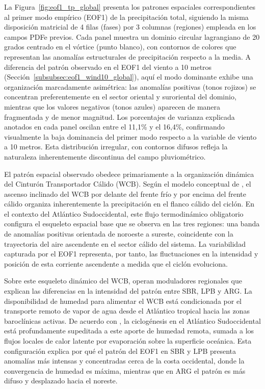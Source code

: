 La Figura~\ref{fig:eof1_tp_global} presenta los patrones espaciales correspondientes al primer modo empírico (EOF1) de la precipitación total, siguiendo la misma disposición matricial de 4 filas (fases) por 3 columnas (regiones) empleada en los campos PDFe previos. 
Cada panel muestra un dominio circular lagrangiano de 20 grados centrado en el vórtice (punto blanco), con contornos de colores que representan las anomalías estructurales de precipitación respecto a la media. 
A diferencia del patrón observado en el EOF1 del viento a 10 metros (Sección~\ref{subsubsec:eof1_wind10_global}), aquí el modo dominante exhibe una organización marcadamente asimétrica: las anomalías positivas (tonos rojizos) se concentran preferentemente en el sector oriental y suroriental del dominio, mientras que los valores negativos (tonos azules) aparecen de manera fragmentada y de menor magnitud. 
Los porcentajes de varianza explicada anotados en cada panel oscilan entre el 11,1\% y el 16,4\%, confirmando visualmente la baja dominancia del primer modo respecto a la variable de viento a 10 metros. 
Esta distribución irregular, con contornos difusos refleja la naturaleza inherentemente discontinua del campo pluviométrico.

El patrón espacial observado obedece primariamente a la organización dinámica del Cinturón Transportador Cálido (WCB). 
Según el modelo conceptual de \citet{browning1986conceptual}, el ascenso inclinado del WCB por delante del frente frío y por encima del frente cálido organiza inherentemente la precipitación en el flanco cálido del ciclón. 
En el contexto del Atlántico Sudoccidental, este flujo termodinámico obligatorio configura el esqueleto espacial base que se observa en las tres regiones: una banda de anomalías positivas orientada de noroeste a sureste, coincidente con la trayectoria del aire ascendente en el sector cálido del sistema. 
La variabilidad capturada por el EOF1 representa, por tanto, las fluctuaciones en la intensidad y posición de esta corriente ascendente a medida que el ciclón evoluciona.

Sobre este esqueleto dinámico del WCB, operan moduladores regionales que explican las diferencias en la intensidad del patrón entre SBR, LPB y ARG. 
La disponibilidad de humedad para alimentar el WCB está condicionada por el transporte remoto de vapor de agua desde el Atlántico tropical hacia las zonas baroclínicas activas. 
De acuerdo con \citet{gozzo2017climatology}, la ciclogénesis en el Atlántico Sudoccidental está profundamente supeditada a este aporte de humedad remota, sumada a los flujos locales de calor latente por evaporación sobre la superficie oceánica. 
Esta configuración explica por qué el patrón del EOF1 en SBR y LPB presenta anomalías más intensas y concentradas cerca de la costa occidental, donde la convergencia de humedad es máxima, mientras que en ARG el patrón es más difuso y desplazado hacia el noreste.

